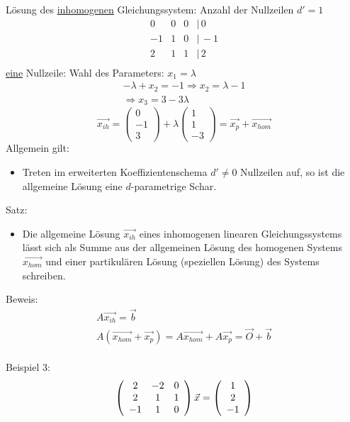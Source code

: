 \documentclass{article}
\begin{document}
Lösung des \underline{inhomogenen} Gleichungssystem: Anzahl der Nullzeilen $d' = 1$
\begin{equation*}
    \begin{matrix}
        0&0&0&|\,0\\
        -1&1&0&|\,-1\\
        2&1&1&|\,2\\
    \end{matrix}
\end{equation*}
\underline{eine} Nullzeile: Wahl des Parameters: $x_1 = \lambda$\\
\begin{eqnarray*}
    -\lambda + x_2 = -1 \Rightarrow x_2 = \lambda - 1\\
                        \Rightarrow x_3 = 3-3\lambda
\end{eqnarray*}
\begin{equation*}
    \vec{x_{ih}}=\left(\begin{array}{c}0\\-1\\3\end{array}\right)+\lambda\left(\begin{array}{c}1\\1\\-3\end{array}\right)=\vec{x_p}+\vec{x_{hom}}
\end{equation*}
Allgemein gilt:
\begin{itemize}
    \item[] Treten im erweiterten Koeffizientenschema $d' \neq 0$ Nullzeilen auf, so ist die allgemeine Lösung eine $d$-parametrige Schar.
\end{itemize}
Satz:
\begin{itemize}
    \item[] Die allgemeine Lösung $\vec{x_{ih}}$ eines inhomogenen linearen Gleichungssystems lässt sich als Summe aus der allgemeinen Lösung des homogenen Systems $\vec{x_{hom}}$ und einer partikulären Lösung (speziellen Lösung) des Systems schreiben.
\end{itemize}
Beweis:
\begin{eqnarray*}
    A\vec{x_{ih}}=\vec{b}\\
    A(\vec{x_{hom}} + \vec{x_p}) = A\vec{x_{hom}} + A\vec{x_p} = \vec{O}+\vec{b}
\end{eqnarray*}
\\
Beispiel 3:
\begin{equation*}
    \left(\begin{array}{c c c }
        2&-2&0\\2&1&1\\-1&1&0
    \end{array}\right) \vec{x} = \left(\begin{array}{c}1\\2\\-1\end{array}\right)
\end{equation*}
\end{document}

